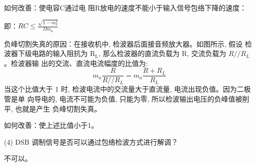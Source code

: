 \documentclass{../source/Experiment}
\begin{document}
如何改善：使电容C通过电
阻R放电的速度不能小于输入信号包络下降的速度：

即：$R C \leq \frac{\sqrt{1-m_{a}^{2}}}{\Omega m_{a}}$

负峰切割失真的原因：在接收机中, 检波器后面接音频放大器。如图所示, 假设 检波器下级电路的输入阻抗为 $\mathrm{R}_{\mathrm{L}}$, 那么检波器的直流负载为 $\mathrm{R}$, 交流负载为 $R / / R_{L}$ 。检波器输 出的交流、直流电流幅度的比值为:
$$
m_{a} \frac{R}{R / / R_{L}}=m_{a} \frac{R+R_{L}}{R_{L}}
$$
当这个比值大于 1 时, 检波电流中的交流量大于直流量, 电流出现负值。因为二极管是单 向导电的, 电流不可能为负值, 只能为零, 所以检波输出电压的负峰值被削平, 也就是产生 负峰切割失真。

如何改善：使上述比值小于1。


(4) DSB 调制信号是否可以通过包络检波方式进行解调？

不可以。
\end{document}
